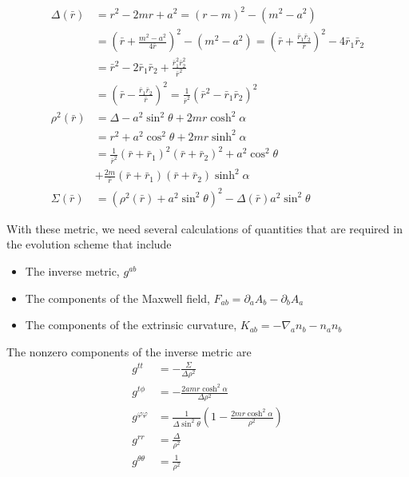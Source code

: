 \documentclass[%
 reprint,
 amsmath,amssymb,
 aps,
]{revtex4-1}
\begin{document}
\begin{align}
\Delta(\bar{r}) &=r^2 - 2mr + a^2 = (r-m)^2 - (m^2 - a^2) \nonumber \\
		      &= \left(\bar{r} + \frac{m^2 - a^2}{4 \bar{r}} \right)^2 - (m^2 - a^2) = \left(\bar{r} + \frac{\bar{r}_1 \bar{r}_2}{ \bar{r}} \right)^2 - 4 \bar{r}_1 \bar{r}_2 \nonumber \\
		      &= \bar{r}^2 - 2 \bar{r}_1 \bar{r}_2 + \frac{\bar{r}_1^2 \bar{r}_2^2}{\bar{r}^2}  \nonumber \\
		      & = \left(\bar{r} - \frac{\bar{r}_1 \bar{r}_2}{ \bar{r}} \right)^2 = \frac{1}{\bar{r}^2} (\bar{r}^2 - \bar{r}_1 \bar{r}_2)^2 \\
\rho^2(\bar{r}) &=\Delta - a^2 \sin^2 \theta + 2mr \cosh^2 \alpha \nonumber \\
	   &= r^2 + a^2 \cos^2 \theta + 2mr \sinh^2 \alpha \nonumber \\
	   &= \frac{1}{\bar{r}^2} (\bar{r} + \bar{r}_1)^2(\bar{r} + \bar{r}_2)^2 + a^2 \cos^2 \theta  \nonumber \\
	   &+ \frac{2 m}{\bar{r}} (\bar{r} + \bar{r}_1)(\bar{r} + \bar{r}_2) \sinh^2 \alpha\\
\Sigma(\bar{r}) &= (\rho^2(\bar{r}) + a^2 \sin^2 \theta)^2 - \Delta(\bar{r}) a^2 \sin^2 \theta
\end{align}

With these metric, we need several calculations of quantities that are required in the evolution scheme that include
\begin{itemize}
\item The inverse metric, $g^{ab}$
\item The components of the Maxwell field, $F_{ab} = \partial_a A_b - \partial_b A_a$
\item The components of the extrinsic curvature, $K_{ab} = -\nabla_a n_b - n_a n_b$
\end{itemize}

The nonzero components of the inverse metric are
\begin{align}
g^{tt} &= -\frac{\Sigma}{\Delta \rho^2} \\
g^{t \phi} &= -\frac{2 a m r \cosh^2 \alpha}{\Delta \rho^2} \\
g^{\varphi \varphi} &= \frac{1}{\Delta \sin^2 \theta} \left(1-\frac{2 m r \cosh^2 \alpha}{\rho^2} \right) \\
g^{rr} &= \frac{\Delta}{\rho^2} \\
g^{\theta \theta} &= \frac{1}{\rho^2}
\end{align}
\end{document}
